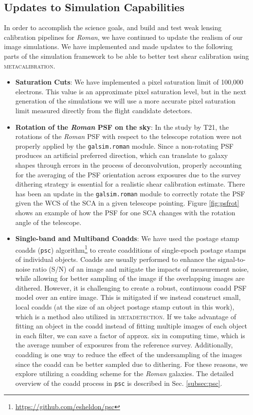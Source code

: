 \documentclass[fleqn,usenatbib]{mnras}
\begin{document}
\subsection{Updates to Simulation Capabilities}
In order to accomplish the science goals, and build and test weak lensing calibration pipelines for \emph{Roman}, we have continued to update the realism of our image simulations. We have implemented and made updates to the following parts of the simulation framework to be able to better test shear calibration using \textsc{metacalibration}. 
\begin{itemize}
    \setlength\itemsep{1em}
    \item \textbf{Saturation Cuts}:
    We have implemented a pixel saturation limit of 100,000 electrons. This value is an approximate pixel saturation level, but in the next generation of the simulations we will use a more accurate pixel saturation limit measured directly from the flight candidate detectors. 
    
    \item \textbf{Rotation of the \emph{Roman} PSF on the sky}:
    In the study by T21, the rotations of the \emph{Roman} PSF with respect to the telescope rotation were not properly applied by the \texttt{galsim.roman} module. Since a non-rotating PSF produces an artificial preferred direction, which can translate to galaxy shapes through errors in the process of deconvolvution, properly accounting for the averaging of the PSF orientation across exposures due to the survey dithering strategy is essential for a realistic shear calibration estimate. There has been an update in the \texttt{galsim.roman} module to correctly rotate the PSF given the WCS of the SCA in a given telescope pointing. Figure \ref{fig:psfrot} shows an example of how the PSF for one SCA changes with the rotation angle of the telescope.
    
    \item \textbf{Single-band and Multiband Coadds}: 
    We have used the postage stamp coadds (\texttt{psc}) algorithm\footnote{\url{https://github.com/esheldon/psc}} to create coadditions of single-epoch postage stamps of individual objects. Coadds are usually performed to enhance the signal-to-noise ratio (S/N) of an image and mitigate the impacts of measurement noise, while allowing for better sampling of the image if the overlapping images are dithered. However, it is challenging to create a robust, continuous coadd PSF model over an entire image. This is mitigated if we instead construct small, local coadds (at the size of an object postage stamp cutout in this work), which is a method also utilized in \textsc{metadetection}. If we take advantage of fitting an object in the coadd instead of fitting multiple images of each object in each filter, we can save a factor of approx. six in computing time, which is the average number of exposures from the reference survey. Additionally, coadding is one way to reduce the effect of the undersampling of the images since the coadd can be better sampled due to dithering. For these reasons, we explore utilizing a coadding scheme for the \emph{Roman} galaxies. The detailed overview of the coadd process in \texttt{psc} is described in Sec. \ref{subsec:psc}. 
    

\end{itemize}
\end{document}
